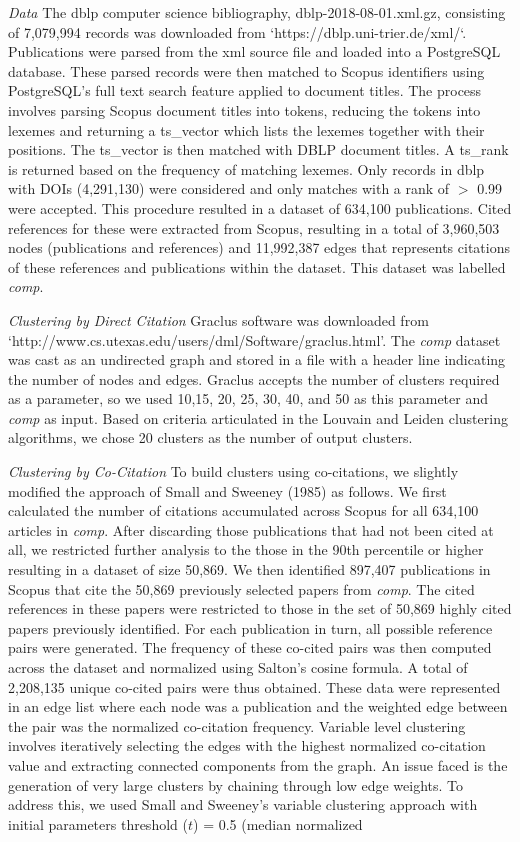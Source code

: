 \emph{Data} The dblp computer science bibliography, dblp-2018-08-01.xml.gz, consisting of 7,079,994 records was downloaded from  `https://dblp.uni-trier.de/xml/`. Publications were parsed from the xml source file and loaded into a PostgreSQL database. These parsed records were then matched to Scopus identifiers using PostgreSQL's full text search feature applied to document titles. The process involves parsing Scopus document titles into tokens, reducing the tokens into lexemes and returning a ts\_vector which lists the lexemes together with their positions. The ts\_vector is then matched with DBLP document titles. A ts\_rank is returned based on the frequency of matching lexemes. Only records in dblp with DOIs (4,291,130) were considered and only matches with a rank of $>$ 0.99 were accepted. This procedure resulted in a dataset of 634,100 publications. Cited references for these were extracted from Scopus, resulting in a total of 3,960,503 nodes (publications and references) and 11,992,387 edges that represents citations of these references and publications within the dataset. This dataset was labelled \emph{comp}.\par \emph{Clustering by Direct Citation} Graclus software was downloaded from \\`http://www.cs.utexas.edu/users/dml/Software/graclus.html'. The \emph{comp} dataset was cast as an undirected graph and stored in a file with a header line indicating the number of nodes and edges. Graclus accepts the number of clusters required as a parameter, so we used 10,15, 20, 25, 30, 40, and 50 as this parameter and  \emph{comp} as input. Based on criteria articulated in the Louvain and Leiden clustering algorithms, we chose 20 clusters as the number of output clusters. \par \emph{Clustering by Co-Citation} To build clusters using co-citations, we slightly modified the approach of Small and Sweeney (1985) as follows. We first calculated the number of citations accumulated across Scopus for all 634,100 articles in \emph{comp}. After discarding those publications that had not been cited at all, we restricted further analysis to the those in the 90th percentile or higher resulting in a dataset of size 50,869. We then identified 897,407 publications in Scopus that cite the 50,869 previously selected papers from \emph{comp}. The cited references in these papers were restricted to those in the set of 50,869 highly cited papers previously identified. For each publication in turn, all possible reference pairs were generated. The frequency of these co-cited pairs was then computed across the dataset  and normalized using Salton's cosine formula. A total of 2,208,135 unique co-cited pairs were thus obtained. These data were represented in an edge list where each node was a publication and the weighted edge between the pair was the normalized co-citation frequency. Variable level clustering involves iteratively selecting the edges with the highest normalized co-citation value and extracting connected components from the graph. An issue faced is the generation of very large clusters by chaining through low edge weights. To address this, we used Small and Sweeney's variable clustering approach with initial parameters threshold ($t$) = 0.5 (median normalized 